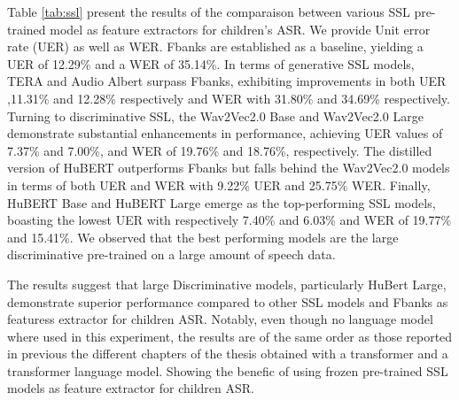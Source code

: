 Table \ref{tab:ssl} present the results of the comparaison between various SSL pre-trained model as feature extractors for children's ASR. We provide Unit error rate (UER) as well as WER. Fbanks are established as a baseline, yielding a UER of 12.29\% and a WER of 35.14\%. In terms of generative SSL models, TERA \cite{tera} and Audio Albert \cite{chi2021audio} surpass Fbanks, exhibiting improvements in both UER ,11.31\% and 12.28\% respectively and WER with 31.80\% and 34.69\% respectively. Turning to discriminative SSL, the Wav2Vec2.0 Base and Wav2Vec2.0 Large demonstrate substantial enhancements in performance, achieving UER values of 7.37\% and 7.00\%, and WER of 19.76\% and 18.76\%, respectively. The distilled version of HuBERT \cite{chang2022distilhubert} outperforms Fbanks but falls behind the Wav2Vec2.0 models in terms of both UER and WER with 9.22\% UER and 25.75\% WER. Finally, HuBERT Base and HuBERT Large emerge as the top-performing SSL models, boasting the lowest UER with respectively 7.40\% and 6.03\% and WER of 19.77\% and 15.41\%. We observed that the best performing models are the large discriminative pre-trained on a large amount of speech data.

The results suggest that large Discriminative models, particularly HuBert Large, demonstrate superior performance compared to other SSL models and Fbanks as featuress extractor for children ASR. Notably, even though no language model where used in this experiment, the results are of the same order as those reported in previous the different chapters of the thesis obtained with a transformer and a transformer language model. Showing the benefic of using frozen pre-trained SSL models as feature extractor for children ASR.


